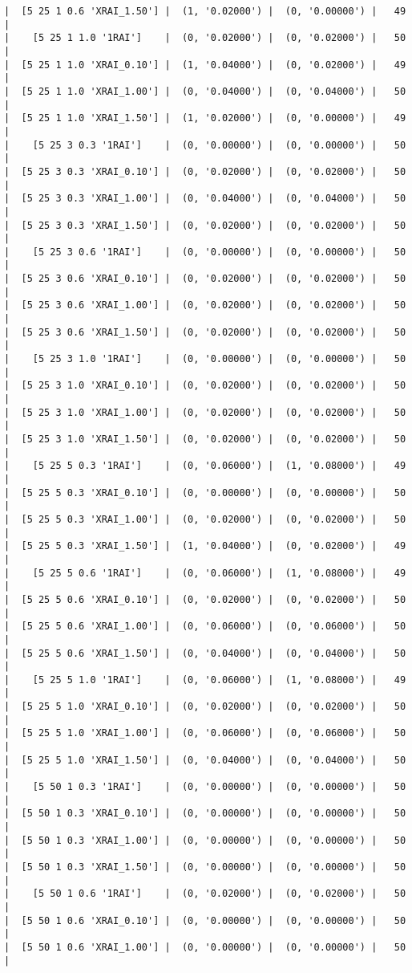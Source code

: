 \documentclass{article}
\begin{document}
\begin{verbatim}
|  [5 25 1 0.6 'XRAI_1.50'] |  (1, '0.02000') |  (0, '0.00000') |   49  |
|    [5 25 1 1.0 '1RAI']    |  (0, '0.02000') |  (0, '0.02000') |   50  |
|  [5 25 1 1.0 'XRAI_0.10'] |  (1, '0.04000') |  (0, '0.02000') |   49  |
|  [5 25 1 1.0 'XRAI_1.00'] |  (0, '0.04000') |  (0, '0.04000') |   50  |
|  [5 25 1 1.0 'XRAI_1.50'] |  (1, '0.02000') |  (0, '0.00000') |   49  |
|    [5 25 3 0.3 '1RAI']    |  (0, '0.00000') |  (0, '0.00000') |   50  |
|  [5 25 3 0.3 'XRAI_0.10'] |  (0, '0.02000') |  (0, '0.02000') |   50  |
|  [5 25 3 0.3 'XRAI_1.00'] |  (0, '0.04000') |  (0, '0.04000') |   50  |
|  [5 25 3 0.3 'XRAI_1.50'] |  (0, '0.02000') |  (0, '0.02000') |   50  |
|    [5 25 3 0.6 '1RAI']    |  (0, '0.00000') |  (0, '0.00000') |   50  |
|  [5 25 3 0.6 'XRAI_0.10'] |  (0, '0.02000') |  (0, '0.02000') |   50  |
|  [5 25 3 0.6 'XRAI_1.00'] |  (0, '0.02000') |  (0, '0.02000') |   50  |
|  [5 25 3 0.6 'XRAI_1.50'] |  (0, '0.02000') |  (0, '0.02000') |   50  |
|    [5 25 3 1.0 '1RAI']    |  (0, '0.00000') |  (0, '0.00000') |   50  |
|  [5 25 3 1.0 'XRAI_0.10'] |  (0, '0.02000') |  (0, '0.02000') |   50  |
|  [5 25 3 1.0 'XRAI_1.00'] |  (0, '0.02000') |  (0, '0.02000') |   50  |
|  [5 25 3 1.0 'XRAI_1.50'] |  (0, '0.02000') |  (0, '0.02000') |   50  |
|    [5 25 5 0.3 '1RAI']    |  (0, '0.06000') |  (1, '0.08000') |   49  |
|  [5 25 5 0.3 'XRAI_0.10'] |  (0, '0.00000') |  (0, '0.00000') |   50  |
|  [5 25 5 0.3 'XRAI_1.00'] |  (0, '0.02000') |  (0, '0.02000') |   50  |
|  [5 25 5 0.3 'XRAI_1.50'] |  (1, '0.04000') |  (0, '0.02000') |   49  |
|    [5 25 5 0.6 '1RAI']    |  (0, '0.06000') |  (1, '0.08000') |   49  |
|  [5 25 5 0.6 'XRAI_0.10'] |  (0, '0.02000') |  (0, '0.02000') |   50  |
|  [5 25 5 0.6 'XRAI_1.00'] |  (0, '0.06000') |  (0, '0.06000') |   50  |
|  [5 25 5 0.6 'XRAI_1.50'] |  (0, '0.04000') |  (0, '0.04000') |   50  |
|    [5 25 5 1.0 '1RAI']    |  (0, '0.06000') |  (1, '0.08000') |   49  |
|  [5 25 5 1.0 'XRAI_0.10'] |  (0, '0.02000') |  (0, '0.02000') |   50  |
|  [5 25 5 1.0 'XRAI_1.00'] |  (0, '0.06000') |  (0, '0.06000') |   50  |
|  [5 25 5 1.0 'XRAI_1.50'] |  (0, '0.04000') |  (0, '0.04000') |   50  |
|    [5 50 1 0.3 '1RAI']    |  (0, '0.00000') |  (0, '0.00000') |   50  |
|  [5 50 1 0.3 'XRAI_0.10'] |  (0, '0.00000') |  (0, '0.00000') |   50  |
|  [5 50 1 0.3 'XRAI_1.00'] |  (0, '0.00000') |  (0, '0.00000') |   50  |
|  [5 50 1 0.3 'XRAI_1.50'] |  (0, '0.00000') |  (0, '0.00000') |   50  |
|    [5 50 1 0.6 '1RAI']    |  (0, '0.02000') |  (0, '0.02000') |   50  |
|  [5 50 1 0.6 'XRAI_0.10'] |  (0, '0.00000') |  (0, '0.00000') |   50  |
|  [5 50 1 0.6 'XRAI_1.00'] |  (0, '0.00000') |  (0, '0.00000') |   50  |

\end{verbatim}
\end{document}
